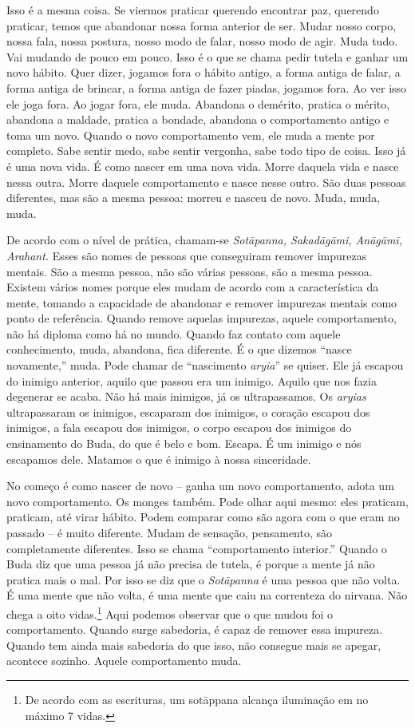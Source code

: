 Isso é a mesma coisa. Se viermos praticar querendo encontrar paz,
querendo praticar, temos que abandonar nossa forma anterior de ser.
Mudar nosso corpo, nossa fala, nossa postura, nosso modo de falar,
nosso modo de agir. Muda tudo. Vai mudando de pouco em pouco. Isso é o
que se chama pedir tutela e ganhar um novo hábito. Quer dizer, jogamos
fora o hábito antigo, a forma antiga de falar, a forma antiga de
brincar, a forma antiga de fazer piadas, jogamos fora. Ao ver isso ele
joga fora. Ao jogar fora, ele muda. Abandona o demérito, pratica o
mérito, abandona a maldade, pratica a bondade, abandona o comportamento
antigo e toma um novo. Quando o novo comportamento vem, ele muda a
mente por completo. Sabe sentir medo, sabe sentir vergonha, sabe todo
tipo de coisa. Isso já é uma nova vida. É como nascer em uma nova vida.
Morre daquela vida e nasce nessa outra. Morre daquele comportamento e
nasce nesse outro. São duas pessoas diferentes, mas são a mesma pessoa:
morreu e nasceu de novo. Muda, muda, muda. 

De acordo com o nível de prática, chamam-se \textit{Sotāpanna,
Sakadāgāmi, Anāgāmī, Arahant.} Esses são nomes de pessoas
que conseguiram remover impurezas mentais. São a mesma pessoa, não são
várias pessoas, são a mesma pessoa. Existem vários nomes porque eles
mudam de acordo com a característica da mente, tomando a capacidade de
abandonar e remover impurezas mentais como ponto de referência. Quando
remove aquelas impurezas, aquele comportamento, não há diploma como há
no mundo. Quando faz contato com aquele conhecimento, muda, abandona,
fica diferente. É o que dizemos “nasce novamente,” muda. Pode chamar de
“nascimento \textit{aryia}” se quiser. Ele já escapou do inimigo
anterior, aquilo que passou era um inimigo. Aquilo que nos fazia
degenerar se acaba. Não há mais inimigos, já os ultrapassamos. Os
\textit{aryias} ultrapassaram os inimigos, escaparam dos inimigos, o
coração escapou dos inimigos, a fala escapou dos inimigos, o corpo
escapou dos inimigos do ensinamento do Buda, do que é belo e bom.
Escapa. É um inimigo e nós escapamos dele. Matamos o que é inimigo à
nossa sinceridade. 

No começo é como nascer de novo – ganha um novo comportamento, adota
um novo comportamento. Os monges também. Pode olhar aqui mesmo: eles
praticam, praticam, até virar hábito. Podem comparar como são agora com
o que eram no passado – é muito diferente. Mudam de sensação,
pensamento, são completamente diferentes. Isso se chama “comportamento
interior.” Quando o Buda diz que uma pessoa já não precisa de tutela, é
porque a mente já não pratica mais o mal. Por isso se diz que o
\textit{Sotāpanna} é uma pessoa que não volta. É uma mente que não
volta, é uma mente que caiu na correnteza do nirvana. Não chega a oito
vidas.\footnote{De acordo com as escrituras, um sotāppana alcança
iluminação em no máximo 7 vidas.} Aqui podemos observar que o que
mudou foi o comportamento. Quando surge sabedoria, é capaz de remover
essa impureza. Quando tem ainda mais sabedoria do que isso, não
consegue mais se apegar, acontece sozinho. Aquele comportamento muda. 

